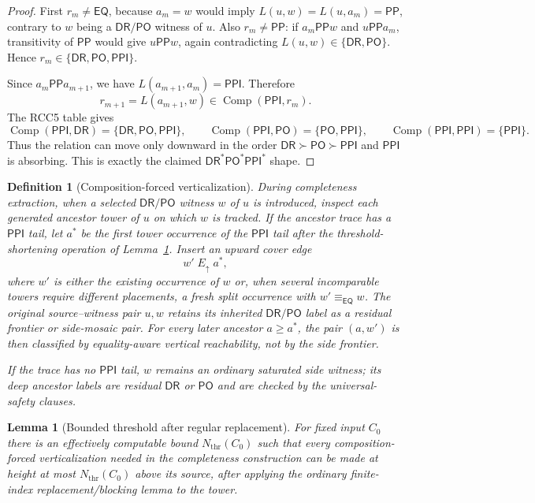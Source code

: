 \documentclass[11pt]{article}
\newtheorem{lemma}[theorem]{Lemma}
\newtheorem{definition}[theorem]{Definition}
\newcommand{\EQ}{\mathsf{EQ}}
\newcommand{\DR}{\mathsf{DR}}
\newcommand{\PO}{\mathsf{PO}}
\newcommand{\PP}{\mathsf{PP}}
\newcommand{\PPI}{\mathsf{PPI}}
\newcommand{\comp}{\operatorname{Comp}}
\newcommand{\eqc}{\equiv_{\EQ}}
\begin{document}
\begin{proof}
First $r_m\ne\EQ$, because $a_m=w$ would imply $L(u,w)=L(u,a_m)=\PP$, contrary to $w$ being a $\DR/\PO$ witness of $u$.  Also $r_m\ne\PP$: if $a_m\PP w$ and $u\PP a_m$, transitivity of $\PP$ would give $u\PP w$, again contradicting $L(u,w)\in\{\DR,\PO\}$.  Hence $r_m\in\{\DR,\PO,\PPI\}$.

Since $a_m\PP a_{m+1}$, we have $L(a_{m+1},a_m)=\PPI$.  Therefore
\[
   r_{m+1}=L(a_{m+1},w)\in \comp(\PPI,r_m).
\]
The RCC5 table gives
\[
 \comp(\PPI,\DR)=\{\DR,\PO,\PPI\},\qquad
 \comp(\PPI,\PO)=\{\PO,\PPI\},\qquad
 \comp(\PPI,\PPI)=\{\PPI\}.
\]
Thus the relation can move only downward in the order $\DR\succ\PO\succ\PPI$ and $\PPI$ is absorbing.  This is exactly the claimed $\DR^*\PO^*\PPI^*$ shape.
\end{proof}

\begin{definition}[Composition-forced verticalization]\label{def:forced-verticalization}
During completeness extraction, when a selected $\DR/\PO$ witness $w$ of $u$ is introduced, inspect each generated ancestor tower of $u$ on which $w$ is tracked.  If the ancestor trace has a $\PPI$ tail, let $a^*$ be the first tower occurrence of the $\PPI$ tail after the threshold-shortening operation of Lemma~\ref{lem:bounded-threshold}.  Insert an upward cover edge
\[
   w'\;E_{\uparrow}\;a^*,
\]
where $w'$ is either the existing occurrence of $w$ or, when several incomparable towers require different placements, a fresh split occurrence with $w'\eqc w$.  The original source--witness pair $u,w$ retains its inherited $\DR/\PO$ label as a residual frontier or side-mosaic pair.  For every later ancestor $a\ge a^*$, the pair $(a,w')$ is then classified by equality-aware vertical reachability, not by the side frontier.

If the trace has no $\PPI$ tail, $w$ remains an ordinary saturated side witness; its deep ancestor labels are residual $\DR$ or $\PO$ and are checked by the universal-safety clauses.
\end{definition}

\begin{lemma}[Bounded threshold after regular replacement]\label{lem:bounded-threshold}
For fixed input $C_0$ there is an effectively computable bound $N_\mathrm{thr}(C_0)$ such that every composition-forced verticalization needed in the completeness construction can be made at height at most $N_\mathrm{thr}(C_0)$ above its source, after applying the ordinary finite-index replacement/blocking lemma to the tower.
\end{lemma}
\end{document}
